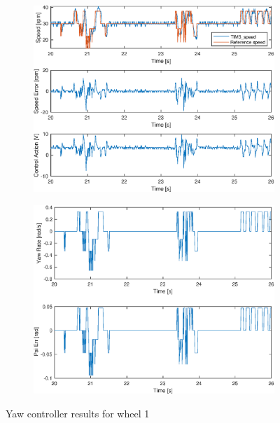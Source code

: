 \begin{figure}[H]
    \centering
    \begin{subfigure}{0.7\textwidth}
        \centering
        \includegraphics[width=\textwidth]{lab4/figures/wheel_1.eps}
    \end{subfigure}
    
    \vspace{0.5cm} %

    \begin{subfigure}{0.7\textwidth}
        \centering
        \includegraphics[width=\textwidth]{lab4/figures/yaw_1.eps}
    \end{subfigure}

    \caption{Yaw controller results for wheel 1}
    \label{fig:yaw_controller_results_wheel_1}
\end{figure}

